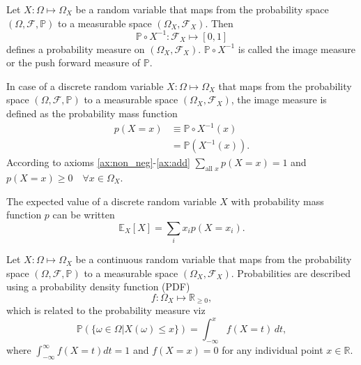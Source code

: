\begin{definition}
	\label{def:image_measure}
	Let $X: \Omega \mapsto \Omega_X$ be a random variable that maps from the probability space $(\Omega, \mathcal{F}, \mathbb{P})$ to a measurable space $(\Omega_X, \mathcal{F}_X)$. Then~\cite{drewitz2019introduction}
	\begin{equation}
		\mathbb{P}\circ X^{-1}: \mathcal{F}_X\mapsto [0,1]
	\end{equation}
	defines a probability measure on $(\Omega_X, \mathcal{F}_X)$. $\mathbb{P}\circ X^{-1}$ is called the image measure or the push forward measure of $\mathbb{P}$.
\end{definition}

\begin{definition}
	\label{def:pmf}
	In case of a discrete random variable $X: \Omega \mapsto \Omega_X$ that maps from the probability space $(\Omega, \mathcal{F}, \mathbb{P})$ to a measurable space $(\Omega_X, \mathcal{F}_X)$, the image measure is defined as the probability mass function
	\begin{equation}
		\begin{split}
			p( X = x) &\equiv  \mathbb{P}\circ X^{-1}(x)\\
			& = \mathbb{P}(X^{-1}(x)).
		\end{split}
		\label{eq:disc}
	\end{equation}
	According to axioms \ref{ax:non_neg}-\ref{ax:add} $\sum_{\text{all }x} p(X=x) = 1$ and $p(X=x) \geq 0 \quad \forall x\in \Omega_X$. 
\end{definition}

\begin{theorem}
	The expected value of a discrete random variable $X$ with probability mass function $p$ can be written
	\begin{equation}
		\mathbb{E}_X[X]=\sum_{i}x_ip(X = x_i).
	\end{equation}
\end{theorem}

\begin{definition}
	\label{def:pdf}
	Let $X: \Omega \mapsto \Omega_X$ be a continuous random variable that maps from the probability space $(\Omega, \mathcal{F}, \mathbb{P})$ to a measurable space $(\Omega_X, \mathcal{F}_X)$. Probabilities are described using a probability density function (PDF) 
	 \begin{equation}
	 	f: \Omega_X \mapsto \mathbb{R}_{\geq 0},
	 \end{equation}
	 which is related to the probability measure viz
	\begin{equation}
		\mathbb{P}(\{\omega \in \Omega | X(\omega) \leq x\}) = \int_{-\infty}^x f(X = t) \, dt,
		\label{eq:cont}
	\end{equation}
	 where $\int_{-\infty}^\infty f(X=t) dt = 1$ and $f(X=x)=0$ for any individual point $x \in \mathbb{R}$.
\end{definition}

